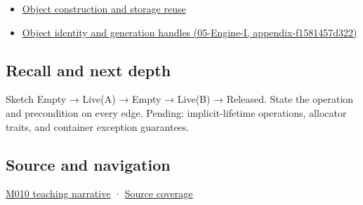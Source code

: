 \begin{itemize}
\tightlist
\item
  \hyperref[appendix-a82f9c438857]{Object construction and storage reuse}
\item
  \href{}{Object identity and generation handles (05-Engine-I, appendix-f1581457d322)}
\end{itemize}

\subsection{Recall and next depth}\label{recall-and-next-depth}

Sketch Empty → Live(A) → Empty → Live(B) → Released. State the operation and precondition on every edge. Pending: implicit-lifetime operations, allocator traits, and container exception guarantees.

\subsection{Source and navigation}\label{source-and-navigation}

\href{Continuous\%20Notes/Computing\%20Foundations\%20-\%20From\%20Bits\%20to\%20C++\%20and\%20Systems\%20APIs\#Placement\%20construction\%20reuses\%20storage;\%20it\%20does\%20not\%20allocate\%20it}{M010 teaching narrative} · \hyperref[appendix-fd090d982a15]{Source coverage}
